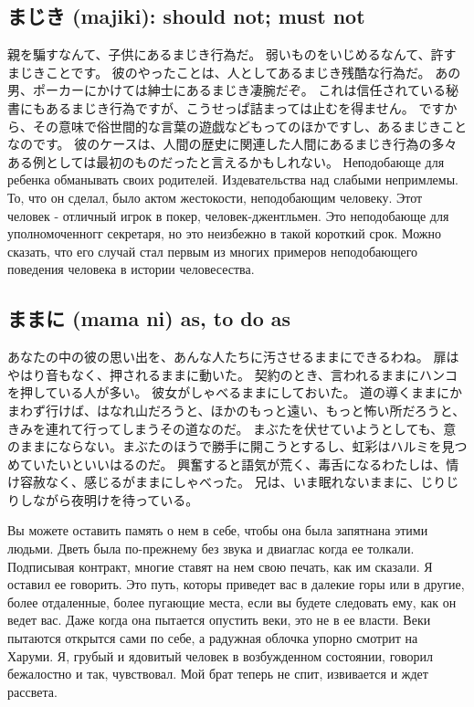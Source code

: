 \subsection{まじき (majiki): should not; must not}

親を騙すなんて、子供にあるまじき行為だ。
弱いものをいじめるなんて、許すまじきことです。
彼のやったことは、人としてあるまじき残酷な行為だ。
あの男、ポーカーにかけては紳士にあるまじき凄腕だぞ。
これは信任されている秘書にもあるまじき行為ですが、こうせっぱ詰まっては止むを得ません。
ですから、その意味で俗世間的な言葉の遊戯などもってのほかですし、あるまじきことなのです。
彼のケースは、人間の歴史に関連した人間にあるまじき行為の多々ある例としては最初のものだったと言えるかもしれない。
Неподобающе для ребенка обманывать своих родителей.
Издевательства над слабыми непримлемы.
То, что он сделал, было актом жестокости, неподобающим человеку.
Этот человек - отличный игрок в покер, человек-джентльмен.
Это неподобающе для уполномоченногг секретаря, но это неизбежно в такой короткий срок.
Можно сказать, что его случай стал первым из многих примеров неподобающего поведения человека в истории человесества.

\subsection{ままに (mama ni) as, to do as}
あなたの中の彼の思い出を、あんな人たちに汚させるままにできるわね。
扉はやはり音もなく、押されるままに動いた。
契約のとき、言われるままにハンコを押している人が多い。
彼女がしゃべるままにしておいた。
道の導くままにかまわず行けば、はなれ山だろうと、ほかのもっと遠い、もっと怖い所だろうと、きみを連れて行ってしまうその道なのだ。
まぶたを伏せていようとしても、意のままにならない。まぶたのほうで勝手に開こうとするし、虹彩はハルミを見つめていたいといいはるのだ。
興奮すると語気が荒く、毒舌になるわたしは、情け容赦なく、感じるがままにしゃべった。
兄は、いま眠れないままに、じりじりしながら夜明けを待っている。


Вы можете оставить память о нем в себе, чтобы она была запятнана этими людьми.
Дветь была по-прежнему без звука и двиаглас когда ее толкали.
Подписывая контракт, многие ставят на нем свою печать, как им сказали.
Я оставил ее говорить.
Это путь, которы приведет вас в далекие горы или в другие, более отдаленные, более пугающие места, если вы будете следовать ему, как он ведет вас.
Даже когда она пытается опустить веки, это не в ее власти. Веки пытаются открытся сами по себе, а радужная облочка упорно смотрит на Харуми.
Я, грубый и ядовитый человек в возбужденном состоянии, говорил бежалостно и так, чувствовал.
Мой брат теперь не спит, извивается и ждет рассвета.
